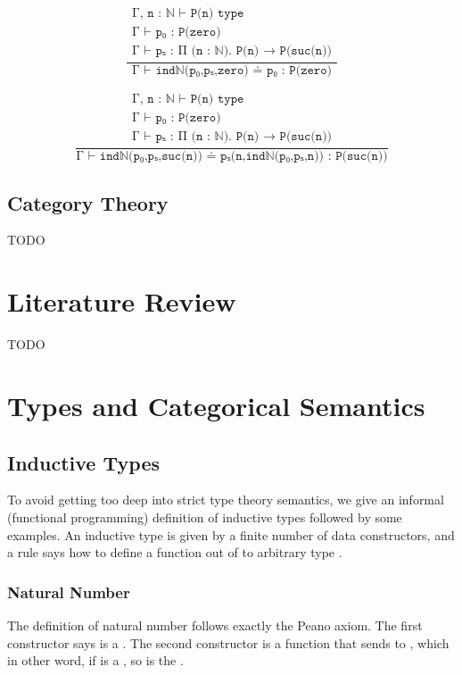 \[
  \frac{
    \begin{array}{l}
      \texttt{Γ, n : ℕ ⊢ P(n) type} \\
      \texttt{Γ ⊢ p₀ : P(zero)} \\
      \texttt{Γ ⊢ pₛ : Π (n : ℕ). P(n) → P(suc(n))}
    \end{array}
  }{
    \texttt{Γ ⊢ indℕ(p₀,pₛ,zero) ≐ p₀ : P(zero)}
  }
\]

\[
  \frac{
    \begin{array}{l}
      \texttt{Γ, n : ℕ ⊢ P(n) type} \\
      \texttt{Γ ⊢ p₀ : P(zero)} \\
      \texttt{Γ ⊢ pₛ : Π (n : ℕ). P(n) → P(suc(n))}
    \end{array}
  }{
    \texttt{Γ ⊢ indℕ(p₀,pₛ,suc(n)) ≐ pₛ(n,indℕ(p₀,pₛ,n)) : P(suc(n))}
  }
\]

\subsection{Category Theory}

TODO

\section{Literature Review}

TODO

\section{Types and Categorical Semantics}

\subsection{Inductive Types}

To avoid getting too deep into strict type theory semantics, we give an informal (functional programming) definition of inductive types followed by some examples. An inductive type  is given by a finite number of data constructors, and a rule says how to define a function out of  to arbitrary type .

\subsubsection*{Natural Number}

The definition of natural number  follows exactly the Peano axiom. The first constructor says  is a . The second constructor is a function that sends  to , which in other word, if  is a , so is the . 

